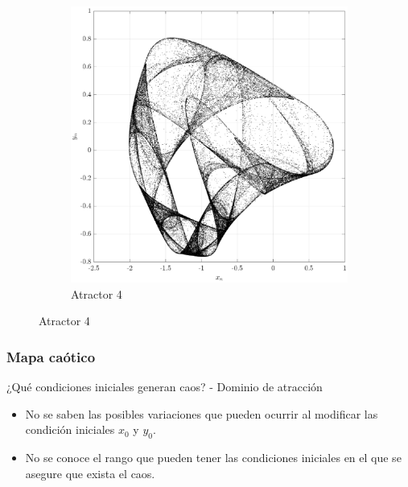 \documentclass[10pt]{beamer}
\begin{document}
\begin{frame}
\begin{figure}[hbtp]
\begin{subfigure}[b]{0.475\textwidth}
                \includegraphics[width=\textwidth,trim=70 0 70 0,clip]{G4_map4}
                \caption{Atractor 4}    
                \label{fig:mapa_4}
            \end{subfigure}
        \end{figure}
\end{frame}


\begin{frame}
    \frametitle{Mapa caótico}
     \begin{block}{¿Qué condiciones iniciales generan caos? - Dominio de atracción}
        \justifying
        \begin{itemize}
            \item No se saben las posibles variaciones que pueden ocurrir al modificar las condición iniciales $x_{0}$ y $y_{0}$.
            \item No se conoce el rango que pueden tener las condiciones iniciales en el que se asegure que exista el caos.
        \end{itemize}
	\end{block}
\end{frame}
\end{document}
